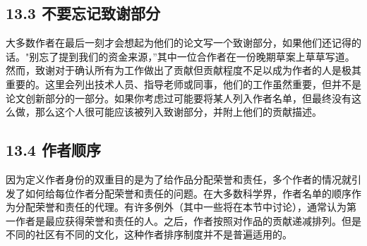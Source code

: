 \subsection*{13.3 不要忘记致谢部分}
大多数作者在最后一刻才会想起为他们的论文写一个致谢部分，如果他们还记得的话。"别忘了提到我们的资金来源，”其中一位合作者在一份晚期草案上草草写道。然而，致谢对于确认所有为工作做出了贡献但贡献程度不足以成为作者的人是极其重要的。这里会列出技术人员、指导老师或同事，他们的工作虽然重要，但并不是论文创新部分的一部分。如果你考虑过可能要将某人列入作者名单，但最终没有这么做，那么这个人很可能应该被列入致谢部分，并附上他们的贡献描述。

\subsection*{13.4 作者顺序}
因为定义作者身份的双重目的是为了给作品分配荣誉和责任，多个作者的情况就引发了如何给每位作者分配荣誉和责任的问题。在大多数科学界，作者名单的顺序作为分配荣誉和责任的代理。有许多例外（其中一些将在本节中讨论），通常认为第一作者是最应获得荣誉和责任的人。之后，作者按照对作品的贡献递减排列。但是不同的社区有不同的文化，这种作者排序制度并不是普遍适用的。

